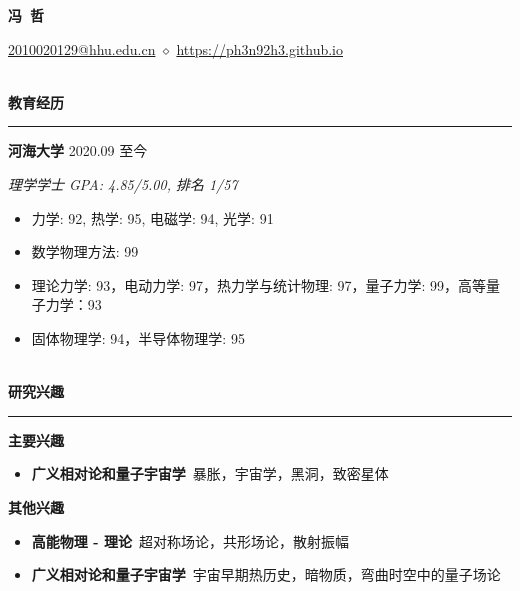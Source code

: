 \documentclass[12pt]{article}
\renewcommand*{\section}[1]{
    ~\\ \noindent \textbf{#1} \medskip \hrule \medskip
}
\begin{document}
\pagestyle{empty}


\begin{center}
    \LARGE{\textbf{冯\ 哲}}
\end{center}

\begin{center}
    \href{mailto:2010020129@hhu.edu.cn}{2010020129@hhu.edu.cn} $\diamond$ \href{https://ph3n92h3.github.io}{https://ph3n92h3.github.io}
\end{center}


\section{教育经历}

\textbf{河海大学} \hfill 2020.09 至今

\smallskip \quad \textit{理学学士 \hfill GPA: 4.85/5.00, 排名 1/57}

\begin{itemize}[noitemsep,nolistsep]
    \item 力学: 92, 热学: 95, 电磁学: 94, 光学: 91
    \item 数学物理方法: 99
    \item 理论力学: 93，电动力学: 97，热力学与统计物理: 97，量子力学: 99，高等量子力学：93
    \item 固体物理学: 94，半导体物理学: 95
\end{itemize}


\section{研究兴趣}

\textbf{主要兴趣}
\begin{itemize}[noitemsep,nolistsep]
    \item \textbf{广义相对论和量子宇宙学}\ 暴胀，宇宙学，黑洞，致密星体
\end{itemize}

\textbf{其他兴趣}
\begin{itemize}[noitemsep,nolistsep]
    \item \textbf{高能物理 - 理论}\ 超对称场论，共形场论，散射振幅
    \item \textbf{广义相对论和量子宇宙学}\ 宇宙早期热历史，暗物质，弯曲时空中的量子场论
\end{itemize}

\end{document}
